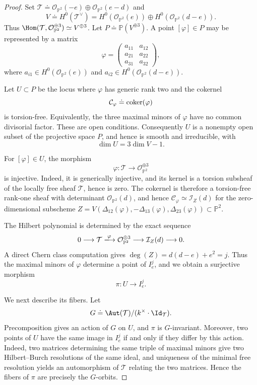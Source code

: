 \documentclass[11pt]{amsart} %
\theoremstyle{definition}
\def\coker{\mbox{\rm coker}}
\def\NZQ{\mathbb}               %
\def\PP{{\NZQ P}}
\def\T{{\mathcal T}}
\begin{document}
\begin{proof}
Set \( \T \doteq
\mathcal O_{\PP^2}(-e)
\oplus
\mathcal O_{\PP^2}(e-d)
\) and
\[
V\doteq H^0(\T^\vee)
=
H^0(\mathcal O_{\PP^2}(e))
\oplus
H^0(\mathcal O_{\PP^2}(d-e)).
\]
Thus \(\Hom(\T,\mathcal O_{\PP^2}^{\oplus3}) \simeq V^{\oplus3}\). Let \( P\doteq\PP(V^{\oplus3})\).
A point $[\varphi]\in P$ may be represented by a matrix
\[
\varphi=
\begin{pmatrix}
a_{11}&a_{12}\\
a_{21}&a_{22}\\
a_{31}&a_{32}
\end{pmatrix},
\]
where
\(
a_{i1}\in H^0(\mathcal O_{\PP^2}(e))\) and \(a_{i2}\in H^0(\mathcal O_{\PP^2}(d-e))\). 

Let $U\subset P$ be the locus where $\varphi$ has generic rank two
and the cokernel
\[
\mathcal C_\varphi\doteq\coker(\varphi)
\]
is torsion-free. Equivalently, the three maximal minors of $\varphi$
have no common divisorial factor. These are open conditions.
Consequently $U$ is a nonempty open subset of the projective space
$P$, and hence is smooth and irreducible, with
\[
\dim U
=
3\dim V-1.
\]

For $[\varphi]\in U$, the morphism
\[
\varphi:\T\longrightarrow\mathcal O_{\PP^2}^{\oplus3}
\]
is injective. Indeed, it is generically injective, and its kernel is
a torsion subsheaf of the locally free sheaf $\T$, hence is zero.
The cokernel is therefore a torsion-free rank-one sheaf with
determinant $\mathcal O_{\PP^2}(d)$, and hence \(\mathcal C_\varphi
\simeq
\mathcal I_Z(d)\)
for the zero-dimensional subscheme $Z=V(\Delta_{12}(\varphi), - \Delta_{13}(\varphi), \Delta_{23}(\varphi))\subset\PP^2$.

The Hilbert polynomial is determined by the exact sequence
\[
0\longrightarrow
\T
\xlongrightarrow{\varphi}
\mathcal O_{\PP^2}^{\oplus3}
\longrightarrow
\mathcal I_Z(d)
\longrightarrow0.
\]
A direct Chern class computation gives \(
\deg(Z)=d(d-e)+e^2=j\). Thus the maximal minors of $\varphi$ determine a point of $I_e^j$,
and we obtain a surjective morphism
\[
\pi:U\longrightarrow I_e^j.
\]

We next describe its fibers. Let
\[
G\doteq
\Aut(\T)/(k^\times \cdot \Id_{\T}).
\]
Precomposition gives an action of $G$ on $U$, and $\pi$ is
$G$-invariant. Moreover, two points of $U$ have the same image in
$I_e^j$ if and only if they differ by this action. Indeed, two
matrices determining the same triple of maximal minors give two
Hilbert--Burch resolutions of the same ideal, and uniqueness of the
minimal free resolution yields an automorphism of $\T$ relating the
two matrices. Hence the fibers of $\pi$ are precisely the
$G$-orbits.


\end{proof}
\end{document}
